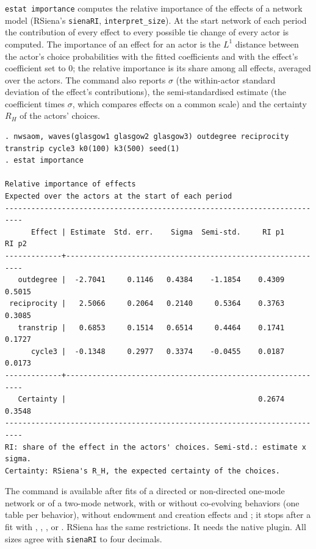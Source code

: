 \texttt{estat importance} computes the relative importance of the effects of a network model (RSiena's \texttt{sienaRI}, \texttt{interpret\_size}). At the start network of each period the contribution of every effect to every possible tie change of every actor is computed. The importance of an effect for an actor is the $L^1$ distance between the actor's choice probabilities with the fitted coefficients and with the effect's coefficient set to 0; the relative importance is its share among all effects, averaged over the actors. The command also reports $\sigma$ (the within-actor standard deviation of the effect's contributions), the semi-standardised estimate (the coefficient times $\sigma$, which compares effects on a common scale) and the certainty $R_H$ of the actors' choices.
\begin{lstlisting}
. nwsaom, waves(glasgow1 glasgow2 glasgow3) outdegree reciprocity transtrip cycle3 k0(100) k3(500) seed(1)
. estat importance

Relative importance of effects
Expected over the actors at the start of each period
--------------------------------------------------------------------------
      Effect | Estimate  Std. err.    Sigma  Semi-std.     RI p1     RI p2
-------------+------------------------------------------------------------
   outdegree |  -2.7041     0.1146   0.4384    -1.1854    0.4309    0.5015
 reciprocity |   2.5066     0.2064   0.2140     0.5364    0.3763    0.3085
   transtrip |   0.6853     0.1514   0.6514     0.4464    0.1741    0.1727
      cycle3 |  -0.1348     0.2977   0.3374    -0.0455    0.0187    0.0173
-------------+------------------------------------------------------------
   Certainty |                                            0.2674    0.3548
--------------------------------------------------------------------------
RI: share of the effect in the actors' choices. Semi-std.: estimate x sigma.
Certainty: RSiena's R_H, the expected certainty of the choices.
\end{lstlisting}
The command is available after fits of a directed or non-directed one-mode network or of a two-mode network, with or without co-evolving behaviors (one table per behavior), without endowment and creation effects and ; it stops after a fit with , , ,  or . RSiena has the same restrictions. It needs the native plugin. All sizes agree with \texttt{sienaRI} to four decimals.

